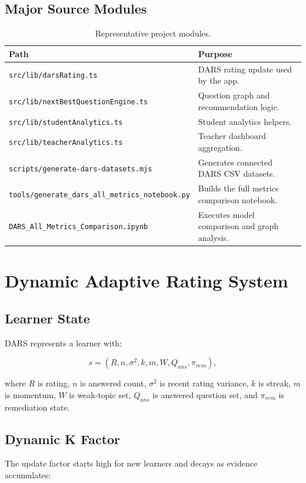 \documentclass[12pt,a4paper]{report}
\begin{document}
\section{Major Source Modules}
\begin{table}[h]
\centering
\caption{Representative project modules.}
\begin{tabularx}{\linewidth}{lX}
\toprule
Path & Purpose \\
\midrule
\texttt{src/lib/darsRating.ts} & DARS rating update used by the app.\\
\texttt{src/lib/nextBestQuestionEngine.ts} & Question graph and recommendation logic.\\
\texttt{src/lib/studentAnalytics.ts} & Student analytics helpers.\\
\texttt{src/lib/teacherAnalytics.ts} & Teacher dashboard aggregation.\\
\texttt{scripts/generate-dars-datasets.mjs} & Generates connected DARS CSV datasets.\\
\texttt{tools/generate\_dars\_all\_metrics\_notebook.py} & Builds the full metrics comparison notebook.\\
\texttt{DARS\_All\_Metrics\_Comparison.ipynb} & Executes model comparison and graph analysis.\\
\bottomrule
\end{tabularx}
\end{table}

\chapter{Dynamic Adaptive Rating System}
\section{Learner State}
DARS represents a learner with:

\begin{equation}
s = (R, n, \sigma^2, k, m, W, Q_{ans}, \pi_{rem}),
\end{equation}

where $R$ is rating, $n$ is answered count, $\sigma^2$ is recent rating variance, $k$ is streak, $m$ is momentum, $W$ is weak-topic set, $Q_{ans}$ is answered question set, and $\pi_{rem}$ is remediation state.

\section{Dynamic K Factor}
The update factor starts high for new learners and decays as evidence accumulates:
\end{document}

